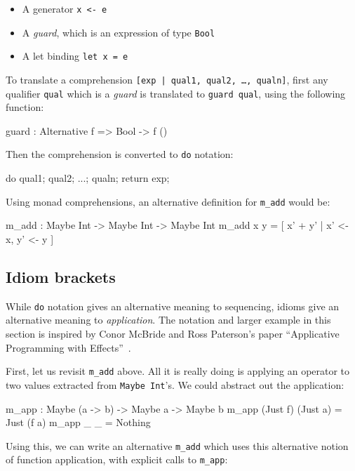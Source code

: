\begin{itemize}
\item A generator \texttt{x <- e}
\item A \emph{guard}, which is an expression of type \texttt{Bool}
\item A let binding \texttt{let x = e}
\end{itemize}

\noindent
To translate a comprehension \texttt{[exp | qual1, qual2, \ldots, qualn]}, first any qualifier \texttt{qual} which is a \emph{guard} is translated to \texttt{guard qual}, using the following function:

\begin{code}
guard : Alternative f => Bool -> f ()
\end{code} 

\noindent
Then the comprehension is converted to \texttt{do} notation:

\begin{code}
do { qual1; qual2; ...; qualn; return exp; }
\end{code} 

\noindent
Using monad comprehensions, an alternative definition for \texttt{m\_add} would be:

\begin{code}
m_add : Maybe Int -> Maybe Int -> Maybe Int
m_add x y = [ x' + y' | x' <- x, y' <- y ]
\end{code} 

\subsection{Idiom brackets}

While \texttt{do} notation gives an alternative meaning to sequencing, idioms give an alternative meaning to \emph{application}.
The notation and larger example in this section is inspired by Conor McBride and Ross Paterson's paper ``Applicative
Programming with Effects''~\cite{idioms}.

First, let us revisit \texttt{m\_add} above. All it is really doing is applying an operator to two values extracted from \texttt{Maybe Int}'s.
We could abstract out the application:

\begin{code}
m_app : Maybe (a -> b) -> Maybe a -> Maybe b
m_app (Just f) (Just a) = Just (f a)
m_app _        _        = Nothing
\end{code} 

\noindent
Using this, we can write an alternative \texttt{m\_add} which uses this alternative notion of function application, with explicit calls to \texttt{m\_app}:

